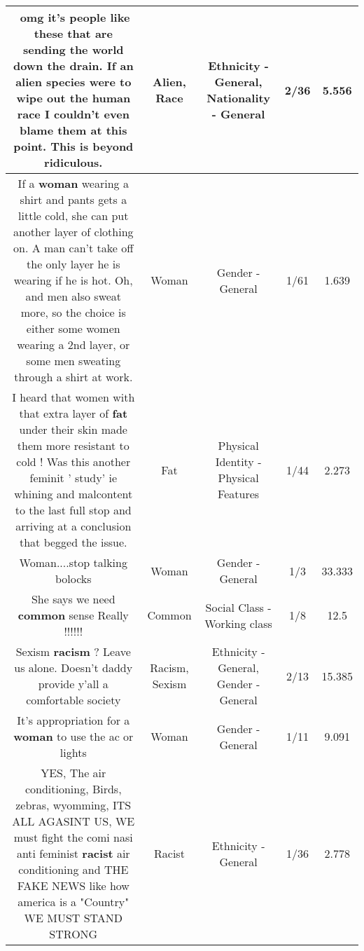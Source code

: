 \documentclass[11pt]{article}
\newlength\mylength
\begin{document}
\begin{center}
\begin{longtable}{|C{.65\mylength}|C{.30\mylength}|C{.12\mylength}|C{.12\mylength}|C{.12\mylength}|}
  \small 😤omg it's people like these that are sending the world down the drain. If an \textbf{alien} species were to wipe out the human \textbf{race} I couldn't even blame them at this point. This is beyond ridiculous.\normalsize   & Alien, Race & Ethnicity - General, Nationality - General & 2/36 & 5.556 \\  \hline
  \small If a \textbf{woman} wearing a shirt and pants gets a little cold, she can put another layer of clothing on. A man can't take off the only layer he is wearing if he is hot. Oh, and men also sweat more, so the choice is either some women wearing a 2nd layer, or some men sweating through a shirt at work.\normalsize   & Woman & Gender - General & 1/61 & 1.639 \\  \hline
  \small I heard that women with that extra layer of \textbf{fat} under their skin made them more resistant to cold ! Was this another feminit ' study'  ie whining and malcontent to the last full stop and arriving at a conclusion that begged the issue.\normalsize   & Fat & Physical Identity - Physical Features & 1/44 & 2.273 \\  \hline
  \small Woman....stop talking bolocks\normalsize   & Woman & Gender - General & 1/3 & 33.333 \\  \hline
  \small She says we need \textbf{common} sense Really !!!!!!\normalsize   & Common & Social Class - Working class & 1/8 & 12.5 \\  \hline
  \small Sexism \textbf{racism} ? Leave us alone. Doesn't daddy provide y'all a comfortable society\normalsize   & Racism, Sexism & Ethnicity - General, Gender - General & 2/13 & 15.385 \\  \hline
  \small It's appropriation for a \textbf{woman} to use the ac or lights\normalsize   & Woman & Gender - General & 1/11 & 9.091 \\  \hline
  \small YES, The air conditioning, Birds, zebras, wyomming, ITS ALL AGASINT US, WE must fight the comi nasi anti feminist \textbf{racist} air conditioning and THE FAKE NEWS like how america is a "Country" WE MUST STAND STRONG\normalsize   & Racist & Ethnicity - General & 1/36 & 2.778 \\  \hline

\end{longtable}
\end{center}
\end{document}
